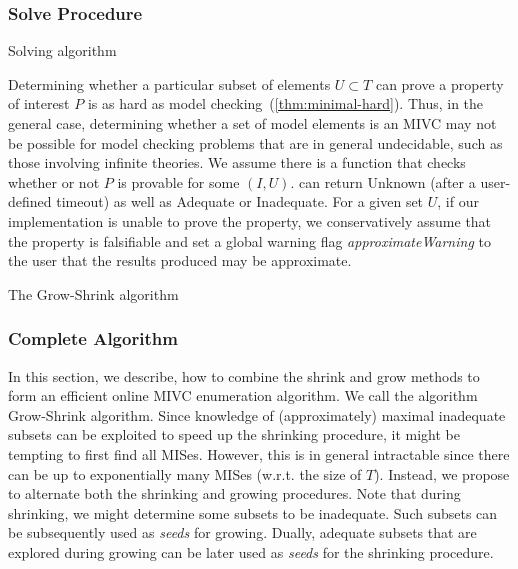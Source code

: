 \subsubsection{Solve Procedure}

\begin{algorithm}[t]
\begin{small}

\caption{Solving algorithm}
\label{alg:solve}
\end{small}
\end{algorithm}

Determining whether a particular subset of elements $U \subset T$ can prove a property of interest $P$ is as hard as model checking~(\ref{thm:minimal-hard}).  Thus, in the general case, determining whether a set of model elements is an MIVC may not be possible for model checking problems that are in general undecidable, such as those involving infinite theories.  We assume there is a function \CheckAdq that checks
whether or not $P$ is provable for some $(I, U)$.  \CheckAdq can return {\sc Unknown}
(after a user-defined timeout) as well as {\sc Adequate}
or {\sc Inadequate}.  For a given set $U$, if our implementation is
unable to prove the property, we conservatively assume that
the property is falsifiable and set a global warning flag {\em approximateWarning} to the
user that the results produced may be approximate.

\begin{algorithm}[t!]
\begin{small}

\caption{The Grow-Shrink algorithm}
\label{alg:allmivc}
\end{small}
\end{algorithm}


\subsubsection{Complete Algorithm}
In this section, we describe, how to combine the shrink and grow methods to form an efficient online MIVC enumeration algorithm. We call the algorithm Grow-Shrink algorithm.
Since knowledge of (approximately) maximal inadequate subsets can be exploited to speed up the shrinking procedure, it might be tempting to first find all MISes.
However, this is in general intractable since there can be up to exponentially many MISes (w.r.t. the size of $T$).
Instead, we propose to alternate both the shrinking and growing procedures.
Note that during shrinking, we might determine some subsets to be inadequate. Such subsets can be subsequently used as \emph{seeds} for growing.
Dually, adequate subsets that are explored during growing can be later used as \emph{seeds} for the shrinking procedure.

